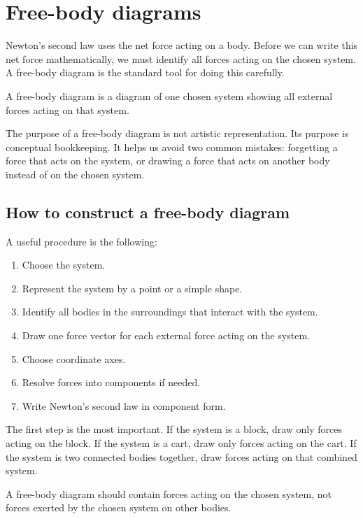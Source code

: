 \section{Free-body diagrams}

Newton's second law uses the net force acting on a body. Before we can write this net force mathematically, we must identify all forces acting on the chosen system. A free-body diagram is the standard tool for doing this carefully.

\begin{definitionbox}
A free-body diagram is a diagram of one chosen system showing all external forces acting on that system.
\end{definitionbox}

The purpose of a free-body diagram is not artistic representation. Its purpose is conceptual bookkeeping. It helps us avoid two common mistakes: forgetting a force that acts on the system, or drawing a force that acts on another body instead of on the chosen system.

\subsection{How to construct a free-body diagram}

A useful procedure is the following:
\begin{enumerate}
\item Choose the system.
\item Represent the system by a point or a simple shape.
\item Identify all bodies in the surroundings that interact with the system.
\item Draw one force vector for each external force acting on the system.
\item Choose coordinate axes.
\item Resolve forces into components if needed.
\item Write Newton's second law in component form.
\end{enumerate}

The first step is the most important. If the system is a block, draw only forces acting on the block. If the system is a cart, draw only forces acting on the cart. If the system is two connected bodies together, draw forces acting on that combined system.

\begin{remarkbox}
A free-body diagram should contain forces acting on the chosen system, not forces exerted by the chosen system on other bodies.
\end{remarkbox}

